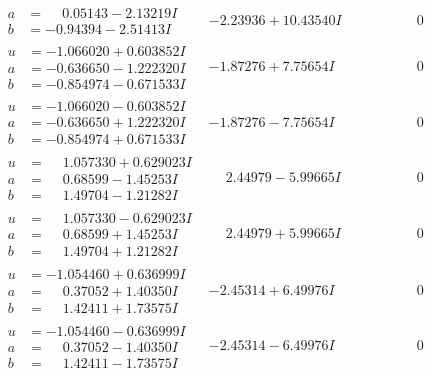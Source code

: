 \documentclass[1p]{elsarticle_modified}
\theoremstyle{definition}
\begin{document}
$$\begin{array}{c|c|c}
\begin{aligned}
a &= \phantom{-}0.05143 - 2.13219 I \\
b &= -0.94394 - 2.51413 I\end{aligned}
 & -2.23936 + 10.43540 I & \phantom{-0.000000 } 0 \\ \hline\begin{aligned}
u &= -1.066020 + 0.603852 I \\
a &= -0.636650 - 1.222320 I \\
b &= -0.854974 - 0.671533 I\end{aligned}
 & -1.87276 + 7.75654 I & \phantom{-0.000000 } 0 \\ \hline\begin{aligned}
u &= -1.066020 - 0.603852 I \\
a &= -0.636650 + 1.222320 I \\
b &= -0.854974 + 0.671533 I\end{aligned}
 & -1.87276 - 7.75654 I & \phantom{-0.000000 } 0 \\ \hline\begin{aligned}
u &= \phantom{-}1.057330 + 0.629023 I \\
a &= \phantom{-}0.68599 - 1.45253 I \\
b &= \phantom{-}1.49704 - 1.21282 I\end{aligned}
 & \phantom{-}2.44979 - 5.99665 I & \phantom{-0.000000 } 0 \\ \hline\begin{aligned}
u &= \phantom{-}1.057330 - 0.629023 I \\
a &= \phantom{-}0.68599 + 1.45253 I \\
b &= \phantom{-}1.49704 + 1.21282 I\end{aligned}
 & \phantom{-}2.44979 + 5.99665 I & \phantom{-0.000000 } 0 \\ \hline\begin{aligned}
u &= -1.054460 + 0.636999 I \\
a &= \phantom{-}0.37052 + 1.40350 I \\
b &= \phantom{-}1.42411 + 1.73575 I\end{aligned}
 & -2.45314 + 6.49976 I & \phantom{-0.000000 } 0 \\ \hline\begin{aligned}
u &= -1.054460 - 0.636999 I \\
a &= \phantom{-}0.37052 - 1.40350 I \\
b &= \phantom{-}1.42411 - 1.73575 I\end{aligned}
 & -2.45314 - 6.49976 I & \phantom{-0.000000 } 0 \\ \hline\begin{aligned}

\end{aligned}
\end{array}$$
\end{document}
